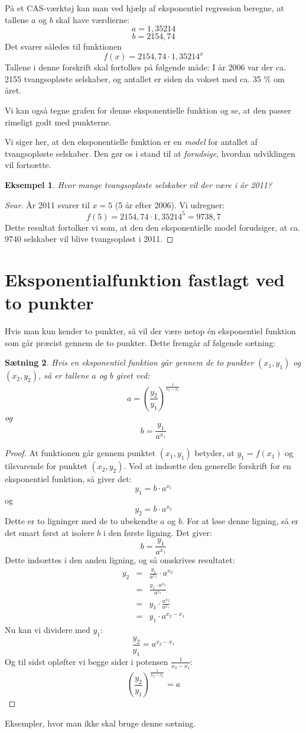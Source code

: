\documentclass[12pt,oneside,a4paper]{article}
\newcommand{\bas}{\begin{eqnarray*}}
\newcommand{\eas}{\end{eqnarray*}}
\newtheorem{thm}{Sætning}[section]
\newtheorem{eks}[thm]{Eksempel}
\begin{document}
På et CAS-værktøj kan man ved hjælp af eksponentiel regression beregne, at tallene $a$ og $b$ skal have værdierne: 
$$
a = 1,35214
$$
$$
b = 2154,74
$$
Det svarer således til funktionen 
$$
f(x) = 2154,74 \cdot 1,35214 ^x
$$
Tallene i denne forskrift skal fortolkes på følgende måde: I år 2006 var der ca. 2155 tvangsopløste selskaber, og antallet er siden da vokset med ca. 35 \% om året.

Vi kan også tegne grafen for denne eksponentielle funktion og se, at den
passer rimeligt godt med punkterne.

Vi siger her, at den eksponentielle funktion er en {\em model} for antallet af
tvangsopløste selskaber. Den gør os i stand til at {\em forudsige}, hvordan
udviklingen vil fortsætte.

\begin{eks}
    Hvor mange tvangsopløste selskaber vil der være i år 2011?
\end{eks}
\begin{proof}[Svar]
    År 2011 svarer til $x=5$ (5 år efter 2006). Vi udregner:
    $$
    f(5) = 2154,74 \cdot 1,35214^5 = 9738,7
    $$
    Dette resultat fortolker vi som, at den den eksponentielle
    model forudsiger, at ca. 9740 selskaber vil blive tvangsopløst i 2011.
\end{proof}
    

\section{Eksponentialfunktion fastlagt ved to punkter}
Hvis man kun kender to punkter, så vil der være netop én eksponentiel funktion
som går præcist gennem de to punkter. Dette fremgår af følgende sætning:

\begin{thm}
    Hvis en eksponentiel funktion går gennem de to punkter $(x_1, y_1)$ og $(x_2, y_2)$,
    så er tallene $a$ og $b$ givet ved:
    $$
    a = \left(\frac{y_2}{y_1}\right)^{\frac{1}{x_2-x_1}}
    $$
    og
    $$
    b = \frac{y_1}{a^{x_1}}
    $$
\end{thm}
\begin{proof}
    At funktionen går gennem punktet $(x_1, y_1)$ betyder, at $y_1 = f(x_1)$ og tilsvarende for punktet
    $(x_2,y_2)$. Ved at indsætte den generelle forskrift for en eksponentiel funktion, så giver det:
    $$
    y_1 = b\cdot a^{x_1}
    $$
    og 
    $$
    y_2 = b \cdot a^{x_2}
    $$
    Dette er to ligninger med de to ubekendte $a$ og $b$. For at løse denne ligning, så er det smart først
    at isolere $b$ i den første ligning. Det giver:
    $$
    b = \frac{y_1}{a^{x_1}}
    $$
    Dette indsættes i den anden ligning, og så omskrives resultatet:
    \bas
    y_2 &=& \frac{y_1}{a^{x_1}} \cdot a^{x_2} \\
    &=& \frac{y_1 \cdot a^{x_2}}{a^{x_1}} \\
    &=& y_1 \cdot \frac{a^{x_2}}{a^{x_1}} \\
    &=& y_1 \cdot a^{x_2-x_1}
    \eas
    Nu kan vi dividere med $y_1$:
    $$
    \frac{y_2}{y_1} = a^{x_2-x_1}
    $$
    Og til sidst opløfter vi begge sider i potensen $\frac{1}{x_2-x_1}$:
    $$
    \left(\frac{y_2}{y_1}\right)^{\frac{1}{x_2-x_1}} = a
    $$
\end{proof}

Eksempler, hvor man ikke skal bruge denne sætning.
\end{document}
